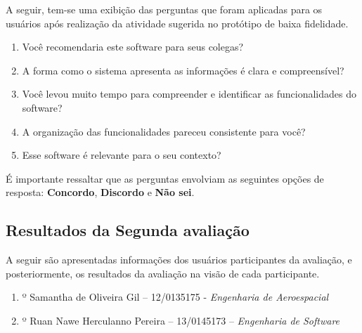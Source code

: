 			A seguir, tem-se uma exibição das perguntas que foram aplicadas para os usuários após realização da atividade sugerida no protótipo de baixa fidelidade.

			\begin{enumerate}
				\item{Você recomendaria este software para seus colegas?}
				\item{A forma como o sistema apresenta as informações é clara e compreensível?}
				\item{Você levou muito tempo para compreender e identificar as funcionalidades do software?}
				\item{A organização das funcionalidades pareceu consistente para você?}
				\item{Esse software é relevante para o seu contexto?}
			\end{enumerate}

			É importante ressaltar que as perguntas envolviam as seguintes opções de resposta: \textbf{Concordo}, \textbf{Discordo} e \textbf{Não sei}.

		\subsection[Resultados da Segunda Avaliação]{Resultados da Segunda avaliação}
		\label{sec:segundaAvaliacao_Resultados}

			A seguir são apresentadas informações dos usuários participantes da avaliação, e posteriormente, os resultados da avaliação na visão de cada participante.

			\begin{enumerate}
				\item{º Samantha de Oliveira Gil – 12/0135175 - \emph{Engenharia de Aeroespacial}}
				\item{º Ruan Nawe Herculanno Pereira – 13/0145173 – \emph{Engenharia de Software}}
			\end{enumerate}

